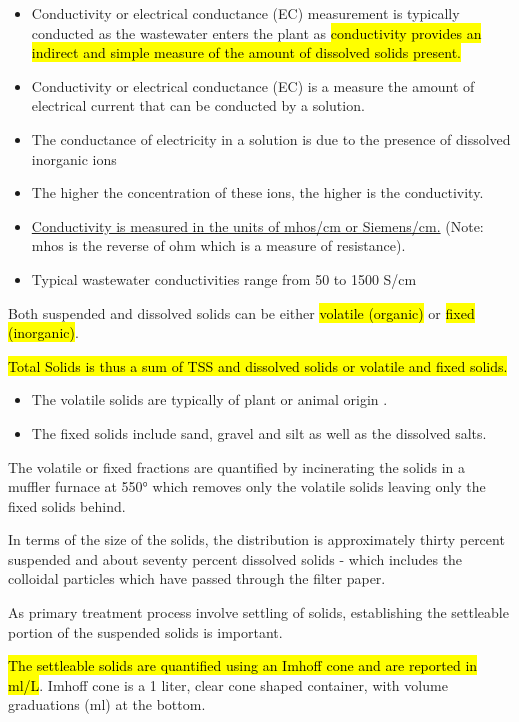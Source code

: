 \begin{itemize}
			      \begin{itemize}
			      	\item Conductivity or electrical conductance (EC) measurement is typically conducted as the wastewater enters the plant as \hl{conductivity provides an indirect and simple measure of the amount of dissolved solids present.}  
			      	\item Conductivity or electrical conductance (EC) is a measure the amount of electrical current that can be conducted by a solution.  
			      	\item The conductance of electricity in a solution is due to the presence of dissolved inorganic ions 
			      	\item The higher the concentration of these ions, the higher is the conductivity. 
			      	\item \underline{Conductivity is measured in the units of mhos/cm or Siemens/cm.}  (Note:  mhos is the reverse of ohm which is a measure of resistance).
			      	\item Typical wastewater conductivities range from 50 to 1500 S/cm
			      \end{itemize}
			\item Both suspended and dissolved solids can be either \hl{volatile (organic)} or \hl{fixed (inorganic)}.
			\item \hl{Total Solids is thus a sum of TSS and dissolved solids or volatile and fixed solids.}
			      \begin{itemize}
			      	\item The volatile solids are typically of plant or animal origin .
			      	\item The fixed solids include sand, gravel and silt as well as the dissolved salts.
			      \end{itemize}
			      \begin{minipage}{0.5\textwidth}
			      	\item The volatile or fixed fractions are quantified by incinerating the solids in a muffler furnace at 550\si{\degree} which removes only the volatile solids leaving only the fixed solids behind.
			      	\item In terms of the size of the solids, the distribution is approximately thirty percent suspended and about seventy percent dissolved solids - which includes the colloidal particles which have passed through the filter paper.\\ 
			      	\item As primary treatment process involve settling of solids, establishing the settleable portion of the suspended solids is important.\\  
			      	\item \hl{The settleable solids are quantified using an Imhoff cone and are reported in ml/L}.  Imhoff cone is a 1 liter, clear cone shaped container, with volume graduations (ml) at the bottom.
			      						

\end{minipage}
\end{itemize}
